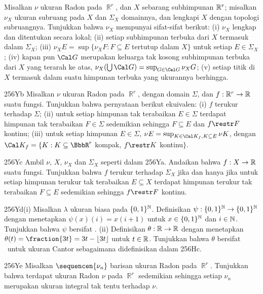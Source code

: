 {
Misalkan $\nu$ ukuran Radon pada $\BbbR^r$, dan $X$ sebarang subhimpunan
$\Bbb R^r$; misalkan $\nu_X$ ukuran subruang pada $X$ dan $\Sigma_X$
domainnya, dan lengkapi $X$ dengan
topologi subruangnya. Tunjukkan bahwa $\nu_X$ mempunyai sifat-sifat berikut:
(i) $\nu_X$ lengkap dan ditentukan secara lokal; (ii) setiap
subhimpunan terbuka dari $X$ termasuk dalam $\Sigma_X$; (iii)
$\nu_XE=\sup\{\nu_XF:F\subseteq E$ tertutup dalam $X\}$ untuk setiap
$E\in\Sigma_X$; (iv) kapan pun $\Cal G$ merupakan keluarga tak kosong
subhimpunan terbuka dari $X$ yang terarah ke atas,
$\nu_X(\bigcup\Cal G)=\sup_{G\in\Cal G}\nu_XG$;
(v) setiap titik di $X$ termasuk dalam suatu himpunan terbuka yang ukurannya berhingga.

\spheader 256Yb Misalkan $\nu$ ukuran Radon pada $\BbbR^r$, dengan domain
$\Sigma$, dan $f:\Bbb R^r\to\Bbb R$ suatu fungsi. Tunjukkan bahwa pernyataan
berikut ekuivalen: (i) $f$ terukur terhadap $\Sigma$;
(ii) untuk setiap himpunan tak terabaikan
$E\in\Sigma$ terdapat himpunan tak terabaikan $F\in\Sigma$ sedemikian
sehingga $F\subseteq E$ dan $f\restr F$ kontinu; (iii) untuk setiap himpunan
$E\in\Sigma$, $\nu E=\sup_{K\in\Cal K_f,K\subseteq E}\nu K$, dengan
$\Cal K_f=\{K:K\subseteq\BbbR^r$ kompak, $f\restr K$ kontinu$\}$.

\spheader 256Yc Ambil $\nu$, $X$, $\nu_X$ dan $\Sigma_X$ seperti dalam 256Ya.
Andaikan bahwa
$f:X\to\Bbb R$ suatu fungsi. Tunjukkan bahwa $f$ terukur terhadap $\Sigma_X$
jika dan hanya jika untuk setiap himpunan terukur tak terabaikan
$E\subseteq X$ terdapat himpunan terukur tak terabaikan $F\subseteq E$
sedemikian sehingga $f\restr F$ kontinu.

\spheader 256Yd(i) Misalkan $\lambda$ ukuran biasa pada
$\{0,1\}^{\Bbb N}$. Definisikan $\psi:\{0,1\}^{\Bbb N}\to\{0,1\}^{\Bbb N}$
dengan menetapkan $\psi(x)(i)=x(i+1)$ untuk $x\in\{0,1\}^{\Bbb N}$ dan
$i\in\Bbb N$. Tunjukkan bahwa $\psi$ bersifat \imp. (ii) Definisikan
$\theta:\Bbb R\to\Bbb R$ dengan menetapkan
$\theta(t)=\fraction{3t}=3t-\lfloor 3t\rfloor$ untuk $t\in\Bbb R$.
Tunjukkan bahwa $\theta$ bersifat \imp\ untuk ukuran Cantor sebagaimana
didefinisikan dalam 256Hc.

\spheader 256Ye Misalkan $\sequencen{\nu_n}$ barisan ukuran Radon
pada $\BbbR^r$. Tunjukkan bahwa terdapat ukuran Radon $\nu$ pada $\BbbR^r$
sedemikian sehingga setiap $\nu_n$ merupakan ukuran integral tak tentu terhadap
$\nu$. 

}
